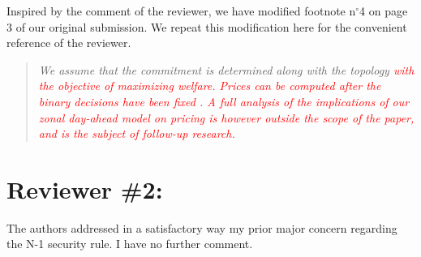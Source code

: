 \documentclass[a4paper,11pt]{article}
\begin{document}
{    Inspired by the comment of the reviewer, we have modified footnote n$^\circ$4 on page 3 of our original submission. %
    We repeat this modification here for the convenient reference of the reviewer. 
    \begin{quotation}
        {\it
            We assume that the commitment is determined along with the topology \textcolor{red}{with the objective of maximizing welfare.
            Prices can be computed after the binary decisions have been fixed \cite{ONeill2010}. A full analysis of the implications of our zonal day-ahead model on pricing is however outside the scope of the paper, and is the subject of follow-up research.}
        }
    \end{quotation}
}

\section{Reviewer \#2:}
The authors addressed in a satisfactory way my prior major concern regarding the N-1 security rule. I have no further comment.




\end{document}

